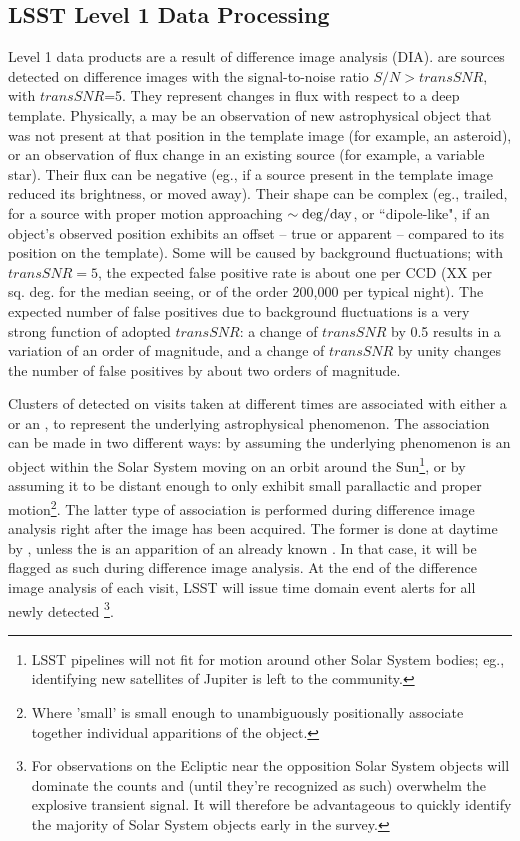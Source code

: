 \subsection{LSST Level 1 Data Processing}

Level 1 data products are a result of difference image analysis (DIA).
\DIASources are sources detected on difference images with the signal-to-noise ratio $S/N>transSNR$,
with $transSNR$=5.
They represent changes in flux with respect to a deep template. Physically, a \DIASource may be an observation of new astrophysical object that was not present at that position in the template image (for example, an asteroid), or an observation of flux change in an existing source (for example, a variable star). Their flux can be negative (eg., if a source present in the template image reduced its brightness, or moved away). Their shape can be complex (eg., trailed, for a source with proper motion approaching $\sim {\rm deg}/{\rm day}$, or ``dipole-like", if an object's observed position exhibits an offset -- true or apparent -- compared to its position on the template).
Some \DIASources will be caused by background fluctuations; with $transSNR = 5$,
the expected false positive rate is about one per CCD (XX per sq. deg. for the median seeing,
or of the order 200,000 per typical night).
The expected number of false positives due to background fluctuations is a very strong function
of adopted $transSNR$: a change of $transSNR$ by 0.5
results in a variation of an order of magnitude, and a change of $transSNR$ by unity changes the number of false
positives by about two orders of magnitude.

Clusters of \DIASources detected on visits taken at different times are associated with either a \DIAObject or an \SSObject, to represent the underlying astrophysical phenomenon. The association can be made in two different ways: by assuming the underlying phenomenon is an object within the Solar System moving on an orbit around the Sun\footnote{LSST pipelines will not fit for motion around other Solar System bodies; eg., identifying new satellites of Jupiter is left to the community.}, or by assuming it to be distant enough to only exhibit small parallactic and proper motion\footnote{Where 'small' is small enough to unambiguously positionally associate together individual apparitions of the object.}. The latter type of association is performed during difference image analysis right after the image has been acquired. The former is done at daytime by , unless the \DIASource is an apparition of an already known \SSObject. In that case, it will be flagged as such during difference image analysis. At the end of the difference image analysis of each visit, LSST will issue time domain event alerts for all
newly detected \DIASources\footnote{For observations on the Ecliptic near the opposition Solar System objects will dominate the \DIASource counts and (until they're recognized as such) overwhelm the explosive transient signal. It will therefore be advantageous to quickly identify the majority of Solar System objects early in the survey.}.

